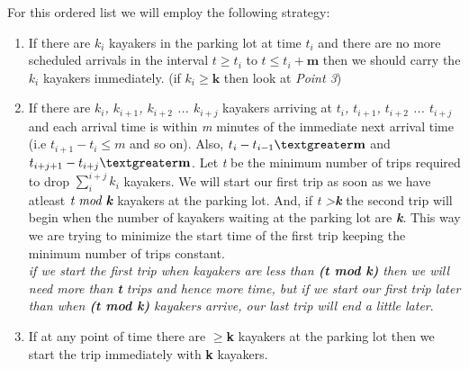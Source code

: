 \documentclass[8pt]{article}
\begin{document}
For this ordered list we will employ the following strategy:
\begin{enumerate}
    \item If there are \textit{$k_i$} kayakers in the parking lot at time \textit{$t_i$} and there are no more scheduled arrivals in the interval \textit{$t \geq t_i$} to \textit{$t \leq t_i + \textbf{m}$} then we should carry the \textit{$k_i$} kayakers immediately. (if $ k_i \geq \textbf{k}$ then look at \textit{Point 3})
    \item If there are \textit{$k_i$, $k_{i+1}$, $k_{i+2}$ ... $k_{i+j}$} kayakers arriving at \textit{$t_i$, $t_{i+1}$, $t_{i+2}$ ... $t_{i+j}$} and each arrival time is within \textit{m} minutes of the immediate next arrival time (i.e  \textit{$t_{i+1} - t_i \leq m$} and so on). Also, \textit{$t_i - t_{i-1} \textgreater \textbf{m}$} and \textit{$t_{i+j+1} - t_{i+j} \textgreater \textbf{m}$}. Let \textit{t} be the minimum number of trips required to drop $\sum_i^{i+j}k_i$ kayakers. We will start our first trip as soon as we have atleast \textbf{$\textit{t mod \textbf{k}}$} kayakers at the parking lot. And, if \textit{t \textgreater \textbf{k}} the second trip will begin when the number of kayakers waiting at the parking lot are \textit{\textbf{k}}. This way we are trying to minimize the start time of the first trip keeping the minimum number of trips constant.
\\
{\footnotesize \textit{if we start the first trip when kayakers are less than \textbf{(t mod k)} then we will need more than \textbf{t} trips and hence more time, but if we start our first trip later than when \textbf{(t mod k)} kayakers arrive, our last trip will end a little later}.}
    \item If at any point of time there are $\geq$\textbf{k} kayakers at the parking lot then we start the trip immediately with \textbf{k} kayakers.
\end{enumerate}
\end{document}
